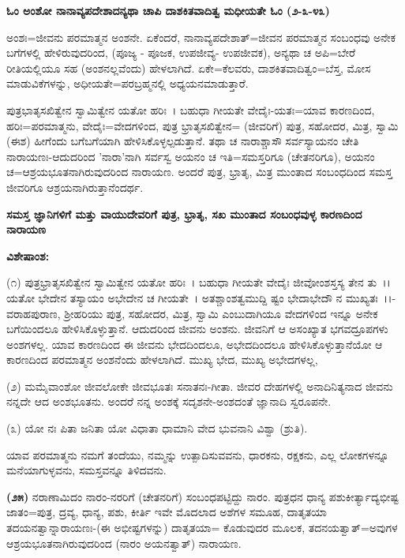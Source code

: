 \begin{center}
\textbf{ಓಂ ಅಂಶೋ ನಾನಾವ್ಯಪದೇಶಾದನ್ಯಥಾ ಚಾಪಿ ದಾಶಕಿತವಾದಿತ್ವ ಮಧೀಯತೇ ಓಂ (೨-೩-೪೩)}
\end{center}

ಅಂಶಃ=ಜೀವನು ಪರಮಾತ್ಮನ ಅಂಶನೇ. ಏಕೆಂದರೆ, ನಾನಾವ್ಯಪದೇಶಾತ್=ಜೀವನ ಪರಮಾತ್ಮನ ಸಂಬಂಧವು ಅನೇಕ ಬಗೆಗಳಲ್ಲಿ ಹೇಳಿರುವುದರಿಂದ, (ಪೂಜ್ಯ - ಪೂಜಕ, ಉಪಜೀವ್ಯ- ಉಪಜೀವಕ), ಅನ್ಯಥಾ ಚ ಅಪಿ=ಬೇರೆ ರೀತಿಯಲ್ಲಿಯೂ ಸಹ (ಅಂಶನಲ್ಲವೆಂದು) ಹೇಳಲಾಗಿದೆ. ಏಕೇ=ಕೆಲವರು, ದಾಶಕಿತವಾದಿತ್ವಂ=ಬೆಸ್ತ, ಮೋಸ ಮಾಡುವಿಕೆಗಳನ್ನು, ಅಧೀಯತೇ=ಪರಬ್ರಹ್ಮನಲ್ಲಿ ಅಧ್ಯಯನಮಾಡುತ್ತಾರೆ.

ಪುತ್ರಭಾತೃಸಖಿತ್ವೇನ ಸ್ವಾಮಿತ್ವೇನ ಯತೋ ಹರಿಃ~। ಬಹುಧಾ ಗೀಯತೇ ವೇದೈಃ-ಯತಃ=ಯಾವ ಕಾರಣದಿಂದ, ಹರಿಃ=ಪರಮಾತ್ಮನು, ವೇದೈಃ=ವೇದಗಳಿಂದ, ಪುತ್ರ ಭ್ರಾತೃಸಖಿತ್ವೇನ= (ಜೀವರಿಗೆ) ಪುತ್ರ, ಸಹೋದರ, ಮಿತ್ರ, ಸ್ವಾಮಿ (ಈಶ) ಹೀಗೆಂದು ಬಗೆಬಗೆಯಾಗಿ ಹೇಳಿಸಿಕೊಳ್ಳಲ್ಪಡುತ್ತಾನೆ. ತಥಾ ಚ ನಾರಾಶ್ಚಾಸೌ ಸರ್ವಸ್ಯಾಯನಂ ಚೇತಿ ನಾರಾ\-ಯಣಃ-ಆದುದರಿಂದ 'ನಾರಾ'ನಾಗಿ ಸರ್ವಸ್ವ ಅಯನಂ ಚ ಇತಿ=ಸಮಸ್ತರಿಗೂ (ಚೇತನರಿಗೂ), ಅಯನಂ ಚ=ಆಶ್ರಯಭೂತನಾಗಿರುವುದರಿಂದ ನಾರಾಯಣ. ಅಂದರೆ ಪುತ್ರ, ಭ್ರಾತೃ, ಮಿತ್ರ ಮುಂತಾದ ಸಂಬಂಧದಿಂದ ಸಮಸ್ತ ಜೀವರಿಗೂ ಆಶ್ರಯನಾಗಿರುತ್ತಾನೆಂದರ್ಥ.

\begin{center}
\textbf{ಸಮಸ್ತ ಜ್ಞಾನಿಗಳಿಗೆ ಮತ್ತು ವಾಯುದೇವರಿಗೆ ಪುತ್ರ, ಭ್ರಾತೃ, ಸಖ ಮುಂತಾದ ಸಂಬಂಧವುಳ್ಳ ಕಾರಣದಿಂದ ನಾರಾಯಣ}
\end{center}

\noindent
\textbf{ವಿಶೇಷಾಂಶ:\enginline{-}}

(೧) ಪುತ್ರಭ್ರಾತೃಸಖಿತ್ವೇನ ಸ್ವಾಮಿತ್ವೇನ ಯತೋ ಹರಿಃ~। ಬಹುಧಾ ಗೀಯತೇ ವೇದೈಃ ಜೀವೋಂಶಸ್ತಸ್ಯ ತೇನ ತು~।। ಯತೋ ಭೇದೇನ ತಸ್ಯಾಯಂ ಅಭೇದೇನ ಚ ಗೀಯತೇ~। ಅತಶ್ಚಾಂಶತ್ವಮುದ್ದಿ ಷ್ಟಂ ಭೇದಾಭೇದೌ ನ ಮುಖ್ಯತಃ~।।-ವರಾಹಪುರಾಣ, ಶ‍್ರೀಹರಿಯು ಪುತ್ರ, ಸಹೋದರ, ಮಿತ್ರ, ಸ್ವಾಮಿ ಎಂಬುದಾಗಿಯೂ ವೇದಗಳಿಂದ ಇನ್ನೂ ಅನೇಕ ಬಗೆಯಿಂದಲೂ ಹೇಳಿಸಿಕೊಳ್ಳುತ್ತಾನೆ. ಆದುದರಿಂದ ಜೀವನು ಅಂಶನು. ಜೀವನಿಗೆ ಆ ಅಸಂಖ್ಯಾತ ಭಗವದ್ರೂಪಗಳು ಅಂಶಗಳಲ್ಲ. ಯಾವ ಕಾರಣದಿಂದ ಈ ಜೀವನು ಭೇದದಿಂದಲೂ, ಅಭೇದದಿಂದಲೂ ಹೇಳಿಸಿಕೊಳ್ಳುತ್ತಾನೆಯೋ ಆ ಕಾರಣದಿಂದ ಪರಮಾತ್ಮನ ಅಂಶನೆಂದು ಹೇಳಲಾಗಿದೆ. ಮುಖ್ಯ ಭೇದ, ಮುಖ್ಯ ಅಭೇದಗಳಲ್ಲ,

(೨) ಮಮೈವಾಂಶೋ ಜೀವಲೋಕೇ ಜೀವಭೂತಃ ಸನಾತನಃ-ಗೀತಾ. ಜೀವರ ದೇಹಗಳಲ್ಲಿ ಅನಾದಿನಿತ್ಯನಾದ ಜೀವನು ನನ್ನದೇ ಆದ ಅಂಶಭೂತನು. ಅಂದರೆ ನನ್ನ ಅಂಶಕ್ಕೆ ಸದೃಶನೇ-ಅಂಶದಂತೆ ಜ್ಞಾನಾದಿ ಸ್ವರೂಪನೇ.

(೩) ಯೋ ನಃ ಪಿತಾ ಜನಿತಾ ಯೋ ವಿಧಾತಾ ಧಾಮಾನಿ ವೇದ ಭುವನಾನಿ ವಿಶ್ವಾ (ಶ್ರುತಿ).

ಯಾವ ಪರಮಾತ್ಮನು ನಮಗೆ ತಂದೆಯು, ನಮ್ಮನ್ನು ಉತ್ಪಾದಿಸುವವನು, ಧಾರಕನು, ರಕ್ಷಕನು, ಎಲ್ಲ ಲೋಕಗಳನ್ನೂ ಮನೆಯಾಗುಳ್ಳವನು, ಸಮಸ್ತವನ್ನೂ ತಿಳಿದವನು.

\textbf{(೨೫)} ನರಾಣಾಮಿದಂ ನಾರಂ-ನರರಿಗೆ (ಚೇತನರಿಗೆ) ಸಂಬಂಧಪಟ್ಟಿದ್ದು ನಾರಂ. ಪುತ್ರಧನ ಧಾನ್ಯ ಪಶುಕೀರ್ತ್ಯಾದ್ಯಭೀಷ್ಟ ಜಾತಂ=ಪುತ್ರ, ದ್ರವ್ಯ, ಧಾನ್ಯ, ಪಶು, ಕೀರ್ತಿ ಇವೇ ಮೊದಲಾದ ಅಶೆಗಳ ಸಮೂಹ, ದಾತೃತಯಾ ತದಯನತ್ವಾನ್ನಾರಾಯಣಃ-(ಈ ಅಭೀಷ್ಟಗಳನ್ನು) ದಾತೃತಯಾ= ಕೊಡುವುದರ ಮೂಲಕ, ತದನಯತ್ವಾತ್=ಅವುಗಳ ಆಶ್ರಯಭೂತನಾಗಿರುವುದರಿಂದ (ನಾರಂ ಅಯನತ್ವಾತ್) ನಾರಾಯಣ.

